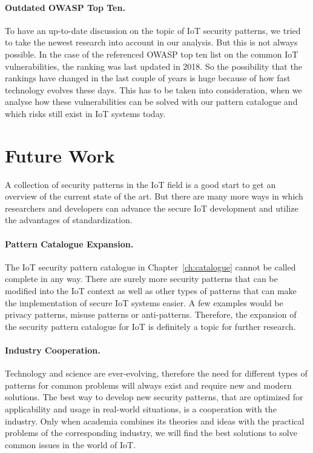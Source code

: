 \paragraph{Outdated OWASP Top Ten.} To have an up-to-date discussion on the topic of IoT security patterns, we tried to take the newest research into account in our analysis. But this is not always possible. In the case of the referenced OWASP top ten list on the common IoT vulnerabilities, the ranking was last updated in 2018. So the possibility that the rankings have changed in the last couple of years is huge because of how fast technology evolves these days. This has to be taken into consideration, when we analyse how these vulnerabilities can be solved with our pattern catalogue and which risks still exist in IoT systems today.


\section{Future Work}\label{sec:future_work}
A collection of security patterns in the IoT field is a good start to get an overview of the current state of the art. But there are many more ways in which researchers and developers can advance the secure IoT development and utilize the advantages of standardization.  

\paragraph{\textbf{Pattern Catalogue Expansion.}} The IoT security pattern catalogue in Chapter~\ref{ch:catalogue} cannot be called complete in any way. There are surely more security patterns that can be modified into the IoT context as well as other types of patterns that can make the implementation of secure IoT systems easier. A few examples would be privacy patterns, misuse patterns or anti-patterns. Therefore, the expansion of the security pattern catalogue for IoT is definitely a topic for further research.   

\paragraph{\textbf{Industry Cooperation.}} Technology and science are ever-evolving, therefore the need for different types of patterns for common problems will always exist and require new and modern solutions. The best way to develop new security patterns, that are optimized for applicability and usage in real-world situations, is a cooperation with the industry. Only when academia combines its theories and ideas with the practical problems of the corresponding industry, we will find the best solutions to solve common issues in the world of IoT. 

